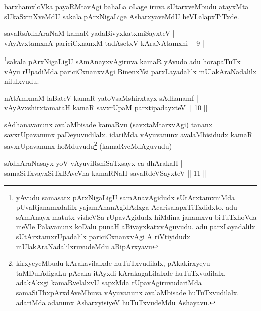 \begin{artha}%
barxhamxloVka payaRMtavAgi bahaLa oLage iruva sUtarxveMbudu atayxMta sUkaSxmXveMdU sakala pArxNigaLige AsharxyaveMdU heVLalapxTiTxde.
\end{artha}

\begin{shl}
savaRsAdhAraNaM kamaR yadaBivyxkatxmiSayxteV |\\
vAyAvxtamxnA pariciCxnanxM tadAsetxV kAraNAtamxni \hfill || 9 ||
\end{shl}

\begin{artha}
\footnote[1]{yAvudu samasatx pArxNigaLigU samAnavAgidudx sUtArxtamxniMda pUvaRjanamxdalilx yajamAna\-nAgidAdxga AcarisalapxTiTxdidxto. adu sAmAnayx-matutx visheVSa rUpavAgidudx hiMdina janamxvu biTuTxhoVda meVle Palavanunx koDalu punaH aBivayxkatxvAguvudu. adu parxLayadalilx sUtArxtamxrUpadalilx pariciCxnanxvAgi A riVtiyidudx mUlakAraNadalilxruvudeMdu aBipArxyavu}sakala pArxNigaLigU sAmAnayxvAgiruva kamaR yAvudo adu horapaTuTx vAyu rUpadiMda pariciCxnanxvAgi BinenxYsi parxLayadalilx mUlakAraNadalilx nilulxvudu.
\end{artha}


\begin{shl}
nA\s \s tAmxnaM laBateV kamaR yatoV\s saMshirxtayx sAdhanamf |\\
vAyAvxshirxtamataH kamaR savxrUpaM parxtipadayxteV \hfill || 10 ||
\end{shl}

\begin{artha}
sAdhanavanunx avalaMbisade kamaRvu (savxtaMtarxvAgi) tananx savxrUpavanunx paDeyuvudilalx. idariMda vAyuvanunx avalaMbisidudx kamaR savxrUpavanunx hoMduvudu\footnote[2]{kirxyeyeMbudu kArakavilalxde huTuTxvudilalx, pAkakirxyeyu taMDulAdigaLu pAcaka itAyxdi kArakagaLilalxde huTuTxvudilalx. adakAkxgi kamaRvelalxvU sapxMda rUpavAgiruvudariMda samaSiThxpArxdA\-veMbuva vAyuvanunx avalaMbisade huTuTxvudilalx. adariMda adanunx AsharxyisiyeV huTuTxvudeMdu Ashayavu.} (kamaRveMdAguvudu)
\end{artha}


\begin{shl}
sAdhAraNasayx yoV vAyuviRshiSaTxsayx ca dhArakaH |\\
samaSiTxvayxSiTxBAveVna kamaRNaH savaRdeVSayxteV \hfill || 11 ||
\end{shl}

